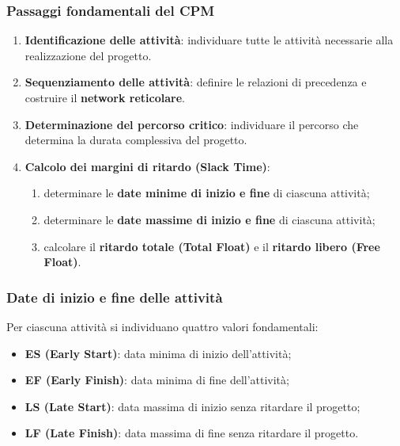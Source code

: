 \subsubsection*{Passaggi fondamentali del CPM}

\begin{enumerate}
    \item \textbf{Identificazione delle attività}: individuare tutte le attività necessarie alla realizzazione del progetto.

    \item \textbf{Sequenziamento delle attività}: definire le relazioni di precedenza e costruire il \textbf{network reticolare}.

    \item \textbf{Determinazione del percorso critico}: individuare il percorso che determina la durata complessiva del progetto.

    \item \textbf{Calcolo dei margini di ritardo (Slack Time)}:
    \begin{enumerate}
        \item determinare le \textbf{date minime di inizio e fine} di ciascuna attività;
        \item determinare le \textbf{date massime di inizio e fine} di ciascuna attività;
        \item calcolare il \textbf{ritardo totale (Total Float)} e il \textbf{ritardo libero (Free Float)}.
    \end{enumerate}
\end{enumerate}

\subsubsection*{Date di inizio e fine delle attività}

\noindent Per ciascuna attività si individuano quattro valori fondamentali:

\begin{itemize}
    \item \textbf{ES (Early Start)}: data minima di inizio dell'attività;
    \item \textbf{EF (Early Finish)}: data minima di fine dell'attività;
    \item \textbf{LS (Late Start)}: data massima di inizio senza ritardare il progetto;
    \item \textbf{LF (Late Finish)}: data massima di fine senza ritardare il progetto.
\end{itemize}

